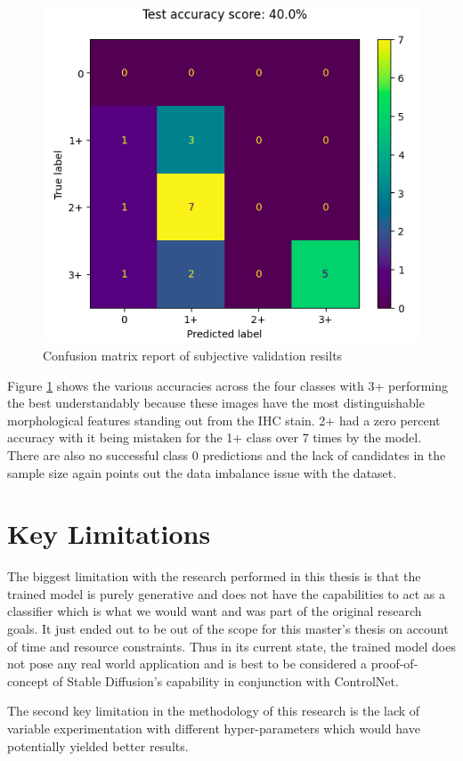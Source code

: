 \begin{figure}[h]
    \centering
    \includegraphics[width=1\linewidth]{5_Results/figures/subj-eval-confusion-matrix.png}
    \caption{Confusion matrix report of subjective validation resilts}
    \label{fig:conf-mat}
\end{figure}

Figure \ref{fig:conf-mat} shows the various accuracies across the four classes with 3+ performing the best understandably because these images have the most distinguishable morphological features standing out from the IHC stain. 2+ had a zero percent accuracy with it being mistaken for the 1+ class over 7 times by the model. There are also no successful class 0 predictions and the lack of candidates in the sample size again points out the data imbalance issue with the dataset.

\section{Key Limitations}

The biggest limitation with the research performed in this thesis is that the trained model is purely generative and does not have the capabilities to act as a classifier which is what we would want and was part of the original research goals. It just ended out to be out of the scope for this master's thesis on account of time and resource constraints. Thus in its current state, the trained model does not pose any real world application and is best to be considered a proof-of-concept of Stable Diffusion's capability in conjunction with ControlNet. 

The second key limitation in the methodology of this research is the lack of variable experimentation with different hyper-parameters which would have potentially yielded better results.


